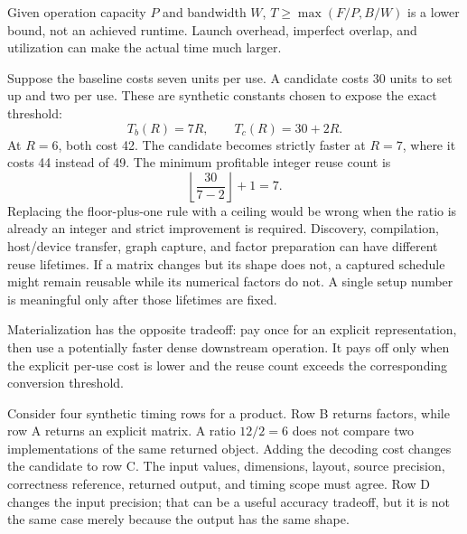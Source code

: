 Given operation capacity $P$ and bandwidth $W$, $T\ge\max(F/P,B/W)$ is a lower bound, not an achieved runtime. Launch overhead, imperfect overlap, and utilization can make the actual time much larger.

Suppose the baseline costs seven units per use. A candidate costs 30 units to set up and two per use. These are synthetic constants chosen to expose the exact threshold:
\[
T_b(R)=7R,\qquad T_c(R)=30+2R.
\]
At $R=6$, both cost 42. The candidate becomes strictly faster at $R=7$, where it costs 44 instead of 49. The minimum profitable integer reuse count is
\[
\left\lfloor\frac{30}{7-2}\right\rfloor+1=7.
\]
Replacing the floor-plus-one rule with a ceiling would be wrong when the ratio is already an integer and strict improvement is required.
Discovery, compilation, host/device transfer, graph capture, and factor preparation can have different reuse lifetimes. If a matrix changes but its shape does not, a captured schedule might remain reusable while its numerical factors do not. A single setup number is meaningful only after those lifetimes are fixed.

Materialization has the opposite tradeoff: pay once for an explicit representation, then use a potentially faster dense downstream operation. It pays off only when the explicit per-use cost is lower and the reuse count exceeds the corresponding conversion threshold.

Consider four synthetic timing rows for a product. Row B returns factors, while row A returns an explicit matrix. A ratio $12/2=6$ does not compare two implementations of the same returned object. Adding the decoding cost changes the candidate to row C.
The input values, dimensions, layout, source precision, correctness reference, returned output, and timing scope must agree. Row D changes the input precision; that can be a useful accuracy tradeoff, but it is not the same case merely because the output has the same shape.

